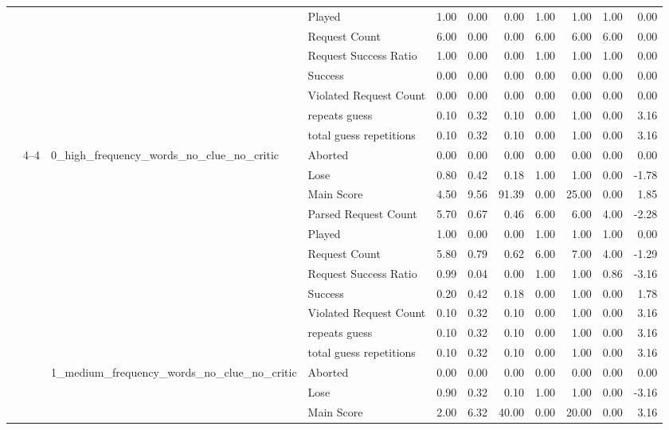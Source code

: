 \begin{tabular}{llllrrrrrrr}
 &  &  & Played & 1.00 & 0.00 & 0.00 & 1.00 & 1.00 & 1.00 & 0.00 \\
 &  &  & Request Count & 6.00 & 0.00 & 0.00 & 6.00 & 6.00 & 6.00 & 0.00 \\
 &  &  & Request Success Ratio & 1.00 & 0.00 & 0.00 & 1.00 & 1.00 & 1.00 & 0.00 \\
 &  &  & Success & 0.00 & 0.00 & 0.00 & 0.00 & 0.00 & 0.00 & 0.00 \\
 &  &  & Violated Request Count & 0.00 & 0.00 & 0.00 & 0.00 & 0.00 & 0.00 & 0.00 \\
 &  &  & repeats guess & 0.10 & 0.32 & 0.10 & 0.00 & 1.00 & 0.00 & 3.16 \\
 &  &  & total guess repetitions & 0.10 & 0.32 & 0.10 & 0.00 & 1.00 & 0.00 & 3.16 \\
\cline{2-11} \cline{3-11}
 & \multirow[t]{33}{*}{4--4} & \multirow[t]{11}{*}{0_high_frequency_words_no_clue_no_critic} & Aborted & 0.00 & 0.00 & 0.00 & 0.00 & 0.00 & 0.00 & 0.00 \\
 &  &  & Lose & 0.80 & 0.42 & 0.18 & 1.00 & 1.00 & 0.00 & -1.78 \\
 &  &  & Main Score & 4.50 & 9.56 & 91.39 & 0.00 & 25.00 & 0.00 & 1.85 \\
 &  &  & Parsed Request Count & 5.70 & 0.67 & 0.46 & 6.00 & 6.00 & 4.00 & -2.28 \\
 &  &  & Played & 1.00 & 0.00 & 0.00 & 1.00 & 1.00 & 1.00 & 0.00 \\
 &  &  & Request Count & 5.80 & 0.79 & 0.62 & 6.00 & 7.00 & 4.00 & -1.29 \\
 &  &  & Request Success Ratio & 0.99 & 0.04 & 0.00 & 1.00 & 1.00 & 0.86 & -3.16 \\
 &  &  & Success & 0.20 & 0.42 & 0.18 & 0.00 & 1.00 & 0.00 & 1.78 \\
 &  &  & Violated Request Count & 0.10 & 0.32 & 0.10 & 0.00 & 1.00 & 0.00 & 3.16 \\
 &  &  & repeats guess & 0.10 & 0.32 & 0.10 & 0.00 & 1.00 & 0.00 & 3.16 \\
 &  &  & total guess repetitions & 0.10 & 0.32 & 0.10 & 0.00 & 1.00 & 0.00 & 3.16 \\
\cline{3-11}
 &  & \multirow[t]{11}{*}{1_medium_frequency_words_no_clue_no_critic} & Aborted & 0.00 & 0.00 & 0.00 & 0.00 & 0.00 & 0.00 & 0.00 \\
 &  &  & Lose & 0.90 & 0.32 & 0.10 & 1.00 & 1.00 & 0.00 & -3.16 \\
 &  &  & Main Score & 2.00 & 6.32 & 40.00 & 0.00 & 20.00 & 0.00 & 3.16 \\

\end{tabular}
